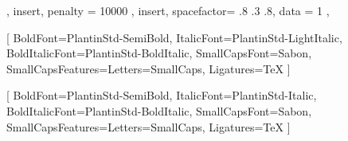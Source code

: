 \usepackage[french, main=latin]{babel}
\usepackage[utf8]{inputenc}
\usepackage[T1]{fontenc}
\usepackage{fontspec}
\usepackage{newunicodechar}

{ {},         %
	{ insert, penalty = 10000 },                 %
	{ insert, spacefactor= .8 .3 .8, data = 1 }, %
	{}          %
}

\newcommand{\frenchpar}[1]{\begin{selectlanguage}{french}#1\end{selectlanguage}}
\newcommand{\fbseries}{\unskip\setBold[0.1]\aftergroup\unsetBold\aftergroup\ignorespaces}

\setmainfont{PlantinStd-Light}[
	BoldFont=PlantinStd-SemiBold,
	ItalicFont=PlantinStd-LightItalic,
	BoldItalicFont=PlantinStd-BoldItalic,
	SmallCapsFont=Sabon,
	SmallCapsFeatures={Letters=SmallCaps},
	Ligatures=TeX
]

\newfontfamily{}
\newfontfamily{}
\newfontfamily{}[
	BoldFont=PlantinStd-SemiBold,
	ItalicFont=PlantinStd-Italic,
	BoldItalicFont=PlantinStd-BoldItalic,
	SmallCapsFont=Sabon,
	SmallCapsFeatures={Letters=SmallCaps},
	Ligatures=TeX
]

\fontsize{11.5pt}{5mm}\courant

\newdimen{\gregoLineDepth}
\gregoLineDepth=3mm

\makeatletter
\renewcommand{\strut}[1][.3\baselineskip]{%
    \hbox{%
        \vrule\@height\z@%
        \@depth#1%
        \@width\z@%
    }%
}
\makeatother
